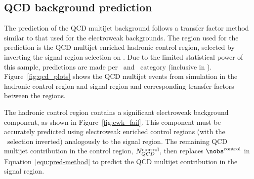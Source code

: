 \subsection{QCD background prediction}
\label{sec:qcd-pred}
The prediction of the QCD multijet background follows a transfer factor method
similar to that used for the electroweak backgrounds. The region used
for the prediction is the QCD multijet enriched hadronic control region, 
selected by inverting the signal region selection on \mhtmet. Due to the limited statistical
power of this sample, predictions are made per \njet~and \scalht~category (inclusive in \nb).
Figure~\ref{fig:qcd_plots} shows the QCD multijet events from simulation 
in the hadronic control region and signal region and corresponding transfer factors
between the regions.

The hadronic control region contains a significant electroweak background component, 
as shown in Figure~\ref{fig:ewk_fail}. This component must be accurately predicted
using electroweak enriched control regions (with the \mhtmet~selection inverted) analogously 
to the signal region. The remaining QCD multijet contribution in the control region,
$N_{QCD}^{\rm control}$, then replaces $\nobs^{\rm control}$ in Equation~\ref{equ:pred-method} 
to predict the QCD multijet contribution in the signal region. 

